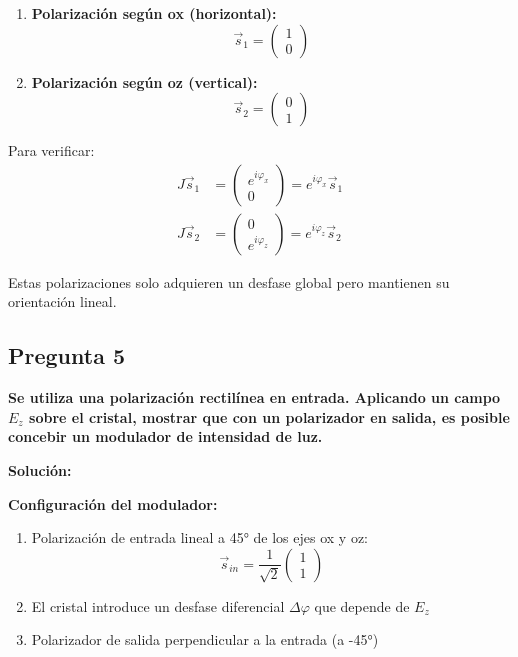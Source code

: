 \documentclass[12pt,a4paper]{article}
\begin{document}
\begin{enumerate}
    \item \textbf{Polarización según ox (horizontal):}
    \begin{equation}
    \vec{s}_1 = \begin{pmatrix} 1 \\ 0 \end{pmatrix}
    \end{equation}
    
    \item \textbf{Polarización según oz (vertical):}
    \begin{equation}
    \vec{s}_2 = \begin{pmatrix} 0 \\ 1 \end{pmatrix}
    \end{equation}
\end{enumerate}

Para verificar:
\begin{align}
J \vec{s}_1 &= \begin{pmatrix} e^{i\varphi_x} \\ 0 \end{pmatrix} = e^{i\varphi_x} \vec{s}_1 \\
J \vec{s}_2 &= \begin{pmatrix} 0 \\ e^{i\varphi_z} \end{pmatrix} = e^{i\varphi_z} \vec{s}_2
\end{align}

Estas polarizaciones solo adquieren un desfase global pero mantienen su orientación lineal.

\subsection*{Pregunta 5}
\textbf{Se utiliza una polarización rectilínea en entrada. Aplicando un campo $E_z$ sobre el cristal, mostrar que con un polarizador en salida, es posible concebir un modulador de intensidad de luz.}

\vspace{0.3cm}
\textbf{Solución:}

\textbf{Configuración del modulador:}

\begin{enumerate}
    \item Polarización de entrada lineal a 45° de los ejes ox y oz:
    \begin{equation}
    \vec{s}_{in} = \frac{1}{\sqrt{2}} \begin{pmatrix} 1 \\ 1 \end{pmatrix}
    \end{equation}
    
    \item El cristal introduce un desfase diferencial $\Delta\varphi$ que depende de $E_z$
    
    \item Polarizador de salida perpendicular a la entrada (a -45°)
\end{enumerate}
\end{document}
